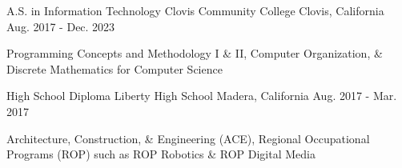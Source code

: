 

\begin{cventries}

  \cventry
    {A.S. in Information Technology} %
    {Clovis Community College} %
    {Clovis, California} %
    {Aug. 2017 - Dec. 2023} %
    {
      \begin{cvitems} %
	  \item {Programming Concepts and Methodology I \& II, Computer Organization, \& Discrete Mathematics for Computer Science}
      \end{cvitems}
    }

  \cventry
    {High School Diploma} %
    {Liberty High School} %
    {Madera, California} %
    {Aug. 2017 - Mar. 2017} %
    {
      \begin{cvitems} %
	  \item {Architecture, Construction, \& Engineering (ACE), Regional Occupational Programs (ROP) such as ROP Robotics \& ROP Digital Media}
      \end{cvitems}
    }

\end{cventries}
